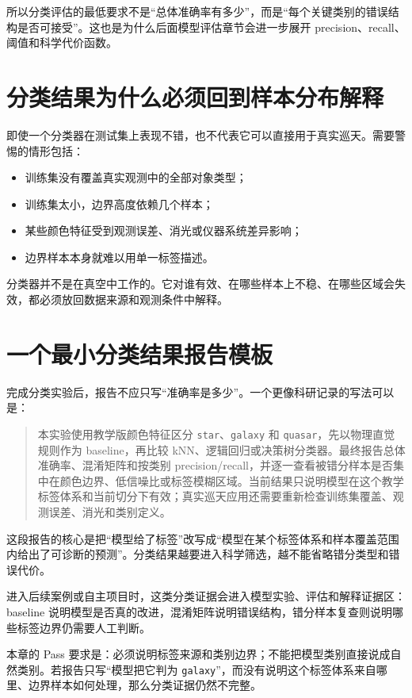 所以分类评估的最低要求不是“总体准确率有多少”，而是“每个关键类别的错误结构是否可接受”。这也是为什么后面模型评估章节会进一步展开 precision、recall、阈值和科学代价函数。

\section{分类结果为什么必须回到样本分布解释}

即使一个分类器在测试集上表现不错，也不代表它可以直接用于真实巡天。需要警惕的情形包括：

\begin{itemize}
    \item 训练集没有覆盖真实观测中的全部对象类型；
    \item 训练集太小，边界高度依赖几个样本；
    \item 某些颜色特征受到观测误差、消光或仪器系统差异影响；
    \item 边界样本本身就难以用单一标签描述。
\end{itemize}

分类器并不是在真空中工作的。它对谁有效、在哪些样本上不稳、在哪些区域会失效，都必须放回数据来源和观测条件中解释。

\section{一个最小分类结果报告模板}

完成分类实验后，报告不应只写“准确率是多少”。一个更像科研记录的写法可以是：

\begin{quote}
本实验使用教学版颜色特征区分 \texttt{star}、\texttt{galaxy} 和 \texttt{quasar}，先以物理直觉规则作为 baseline，再比较 kNN、逻辑回归或决策树分类器。最终报告总体准确率、混淆矩阵和按类别 precision/recall，并逐一查看被错分样本是否集中在颜色边界、低信噪比或标签模糊区域。当前结果只说明模型在这个教学标签体系和当前切分下有效；真实巡天应用还需要重新检查训练集覆盖、观测误差、消光和类别定义。
\end{quote}

这段报告的核心是把“模型给了标签”改写成“模型在某个标签体系和样本覆盖范围内给出了可诊断的预测”。分类结果越要进入科学筛选，越不能省略错分类型和错误代价。

进入后续案例或自主项目时，这类分类证据会进入模型实验、评估和解释证据区：baseline 说明模型是否真的改进，混淆矩阵说明错误结构，错分样本复查则说明哪些标签边界仍需要人工判断。

本章的 Pass 要求是：必须说明标签来源和类别边界；不能把模型类别直接说成自然类别。若报告只写“模型把它判为 \texttt{galaxy}”，而没有说明这个标签体系来自哪里、边界样本如何处理，那么分类证据仍然不完整。

